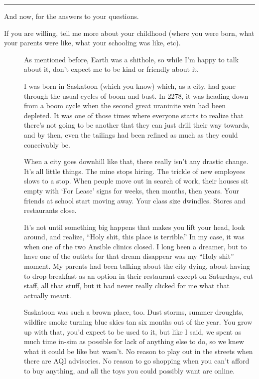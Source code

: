 \begin{center}\rule{0.5\linewidth}{0.5pt}\end{center}

And now, for the answers to your questions.

\begin{description}
\item[If you are willing, tell me more about your childhood (where you were born, what your parents were like, what your schooling was like, etc).]
As mentioned before, Earth was a shithole, so while I'm happy to talk about it, don't expect me to be kind or friendly about it.

I was born in Saskatoon (which you know) which, as a city, had gone through the usual cycles of boom and bust. In 2278, it was heading down from a boom cycle when the second great uraninite vein had been depleted. It was one of those times where everyone starts to realize that there's not going to be another that they can just drill their way towards, and by then, even the tailings had been refined as much as they could conceivably be.

When a city goes downhill like that, there really isn't any drastic change. It's all little things. The mine stops hiring. The trickle of new employees slows to a stop. When people move out in search of work, their houses sit empty with `For Lease' signs for weeks, then months, then years. Your friends at school start moving away. Your class size dwindles. Stores and restaurants close.

It's not until something big happens that makes you lift your head, look around, and realize, ``Holy shit, this place is terrible.'' In my case, it was when one of the two Ansible clinics closed. I long been a dreamer, but to have one of the outlets for that dream disappear was my ``Holy shit'' moment. My parents had been talking about the city dying, about having to drop breakfast as an option in their restaurant except on Saturdays, cut staff, all that stuff, but it had never really clicked for me what that actually meant.

Saskatoon was such a brown place, too. Dust storms, summer droughts, wildfire smoke turning blue skies tan six months out of the year. You grow up with that, you'd expect to be used to it, but like I said, we spent as much time in-sim as possible for lack of anything else to do, so we knew what it could be like but wasn't. No reason to play out in the streets when there are AQI advisories. No reason to go shopping when you can't afford to buy anything, and all the toys you could possibly want are online.


\end{description}
